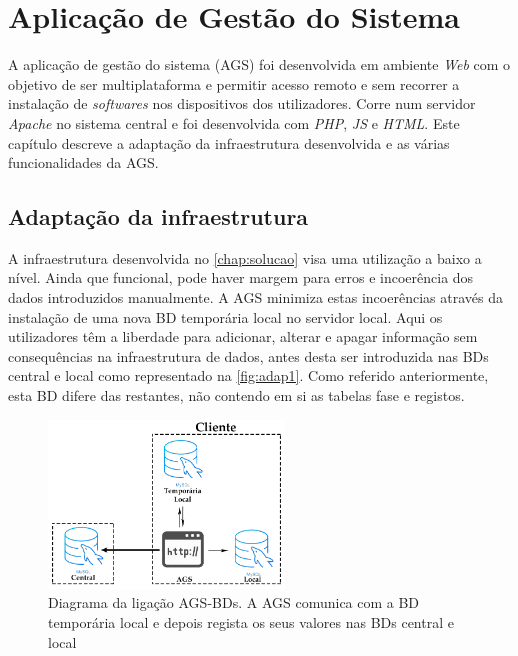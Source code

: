 \documentclass[11pt,twoside,a4paper]{report}
\begin{document}
\cleardoublepage
\chapter{Aplicação de Gestão do Sistema}
\label{chap:aplicacao}
A aplicação de gestão do sistema (AGS) foi desenvolvida em ambiente \textit{Web} com o objetivo de ser multiplataforma e permitir acesso remoto e sem recorrer a instalação de \textit{softwares} nos dispositivos dos utilizadores. Corre num servidor \textit{Apache} no sistema central e foi desenvolvida com \textit{PHP}, \textit{JS} e \textit{HTML}. Este capítulo descreve a adaptação da infraestrutura desenvolvida e as várias funcionalidades da AGS.

\section{Adaptação da infraestrutura}
\label{subchap:adap}
A infraestrutura desenvolvida no \autoref{chap:solucao} visa uma utilização a baixo a nível. Ainda que funcional, pode haver margem para erros e incoerência dos dados introduzidos manualmente. A AGS minimiza estas incoerências através da instalação de uma nova BD temporária local no servidor local. Aqui os utilizadores têm a liberdade para adicionar, alterar e apagar informação sem consequências na infraestrutura de dados, antes desta ser introduzida nas BDs central e local como representado na \autoref{fig:adap1}. Como referido anteriormente, esta BD difere das restantes, não contendo em si as tabelas fase e registos.
\begin{figure}[H]
	\begin{center}
		\includegraphics[width=0.56\textwidth]{Aplicacao_temp_local_central} %
		\caption[Diagrama da ligação AGS-BDs]{Diagrama da ligação AGS-BDs. A AGS comunica com a BD temporária local e depois regista os seus valores nas BDs central e local}
		\label{fig:adap1}
	\end{center}
\end{figure}
\end{document}
